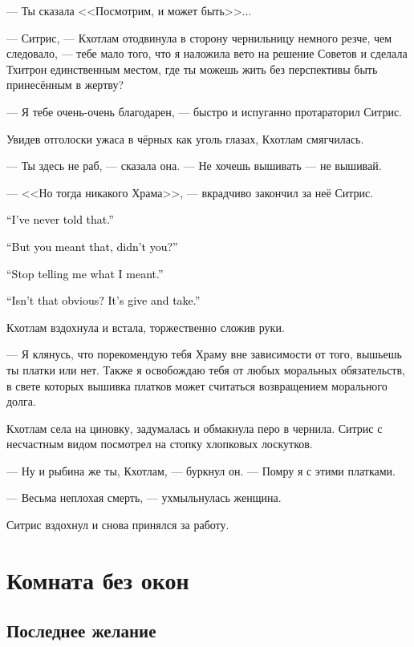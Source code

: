 \documentclass[a4paper,10pt,fleqn]{book}\usepackage{cooltooltips}\usepackage{polyglossia}\setdefaultlanguage{english}\setotherlanguage{russian}\defaultfontfeatures{Ligatures=TeX,Mapping=tex-text} \usepackage{xcolor}\definecolor{lightgray}{HTML}{bbbbbb}\color{lightgray}\newcommand{\ml}[3]{\textcolor{black}{#3}}
\begin{document}
--- Ты сказала <<Посмотрим, и может быть>>...

--- Ситрис, --- Кхотлам отодвинула в сторону чернильницу немного резче, чем следовало, --- тебе мало того, что я наложила вето на решение Советов и сделала Тхитрон единственным местом, где ты можешь жить без перспективы быть принесённым в жертву?

--- Я тебе очень-очень благодарен, --- быстро и испуганно протараторил Ситрис.

Увидев отголоски ужаса в чёрных как уголь глазах, Кхотлам смягчилась.

--- Ты здесь не раб, --- сказала она.
--- Не хочешь вышивать --- не вышивай.

--- <<Но тогда никакого Храма>>, --- вкрадчиво закончил за неё Ситрис.

\ml{$0$}
{--- Я этого не говорила.}
{``I've never told that.''}

\ml{$0$}
{--- Но ты ведь имела это в виду, верно?}
{``But you meant that, didn't you?''}

\ml{$0$}
{--- Хватит говорить мне, что я имела в виду.}
{``Stop telling me what I meant.''}

\ml{$0$}
{--- Разве это не очевидно?}
{``Isn't that obvious?}
\ml{$0$}
{Ты --- мне, я --- тебе.}
{It's give and take.''}

Кхотлам вздохнула и встала, торжественно сложив руки.

--- Я клянусь, что порекомендую тебя Храму вне зависимости от того, вышьешь ты платки или нет.
Также я освобождаю тебя от любых моральных обязательств, в свете которых вышивка платков может считаться возвращением морального долга.

Кхотлам села на циновку, задумалась и обмакнула перо в чернила.
Ситрис с несчастным видом посмотрел на стопку хлопковых лоскутков.

--- Ну и рыбина же ты, Кхотлам, --- буркнул он.
--- Помру я с этими платками.

--- Весьма неплохая смерть, --- ухмыльнулась женщина.

Ситрис вздохнул и снова принялся за работу.

\chapter{Комната без окон}

\section{Последнее желание}
\end{document}
